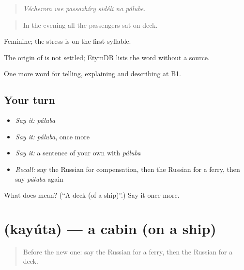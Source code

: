 \begin{quote}
\emph{Vécherom vse passazhíry sidéli na pálube.}
\end{quote}

\begin{quote}
In the evening all the passengers sat on deck.
\end{quote}

Feminine; the stress is on the first syllable.

\begin{cousinweb}
The origin of \emph{} is not settled; EtymDB lists the word without a source.
\end{cousinweb}

\begin{grammarlens}[title={What you've built}]
One more word for telling, explaining and describing at B1.
\end{grammarlens}

\subsection*{Your turn}
\begin{itemize}
\raggedright
  \item \emph{Say it:} \emph{páluba}
  \item \emph{Say it:} \emph{páluba}, once more
  \item \emph{Say it:} a sentence of your own with \emph{páluba}
  \item \emph{Recall:} say the Russian for compensation, then the Russian for a ferry, then say \emph{páluba} again
\end{itemize}

\begin{tcolorbox}[breakable,colback=teal!4,colframe=teal!35!black,title={Before you move on}]
What does  mean? (\textquotedblleft{}A deck (of a ship)\textquotedblright{}.) Say it once more.
\end{tcolorbox}
\section[\texorpdfstring{\ru{каюта} (kayúta)}{каюта (kayúta)}]{ (kayúta) — a cabin (on a ship)}

\label{lesson:RU-C424-kayuta}



\begin{quote}
Before the new one: say the Russian for a ferry, then the Russian for a deck.
\end{quote}


